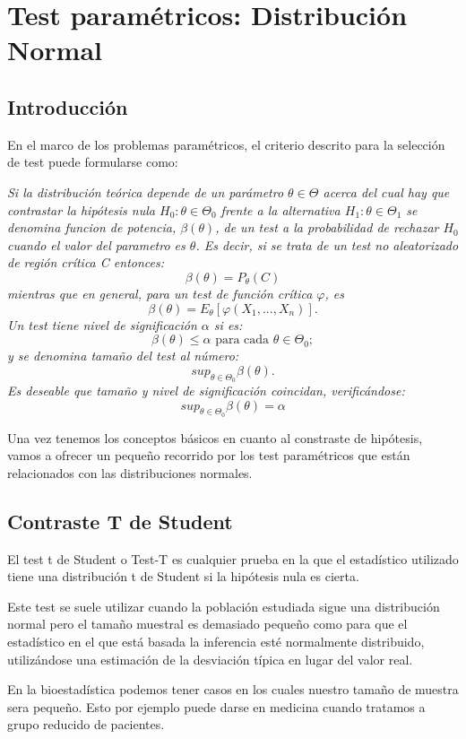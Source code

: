 \documentclass[a4paper,12pt]{article}
\begin{document}
\section{Test paramétricos: Distribución Normal}
\subsection{Introducción}
En el marco de los problemas paramétricos, el criterio descrito para la selección de test puede formularse como:

\textit{ Si la distribución teórica depende de un parámetro $\theta \in \Theta$ acerca del cual hay que contrastar la hipótesis nula $H_0: \theta \in \Theta_0$ frente a la alternativa $H_1: \theta \in \Theta_1$ se denomina funcion de potencia, $\beta(\theta)$, de un test a la probabilidad de rechazar $H_0$ cuando el valor del parametro es $\theta$. Es decir, si se trata de un test no aleatorizado de región crítica C entonces: $$\beta(\theta)=P_\theta(C)$$
mientras que en general, para un test de función crítica $\varphi$, es $$\beta(\theta)=E_\theta[\varphi(X_1,...,X_n)].$$
Un test tiene nivel de significación $\alpha$ si es:  $$\beta(\theta)\leq\alpha \text{ para cada } \theta \in \Theta_0;$$
y se denomina tamaño del test al número: $$sup_{\theta\in\Theta_0}\beta(\theta).$$
Es deseable que tamaño y nivel de significación coincidan, verificándose: 
$$sup_{\theta\in\Theta_0}\beta(\theta)=\alpha$$ }

Una vez tenemos los conceptos básicos en cuanto al constraste de hipótesis, vamos a ofrecer un pequeño recorrido por los test paramétricos que están relacionados con las distribuciones normales.


 \subsection{Contraste T de Student}
 El test t de Student o Test-T es cualquier prueba en la que el estadístico utilizado tiene una distribución t de Student si la hipótesis nula es cierta.
 
 Este test se suele utilizar cuando la población estudiada sigue una distribución normal pero el tamaño muestral es demasiado pequeño como para que el estadístico en el que está basada la inferencia esté normalmente distribuido, utilizándose una estimación de la desviación típica en lugar del valor real. 
 
 En la bioestadística podemos tener casos en los cuales nuestro tamaño de muestra sera pequeño. Esto por ejemplo puede darse en medicina cuando tratamos a grupo reducido de pacientes. 
\end{document}
